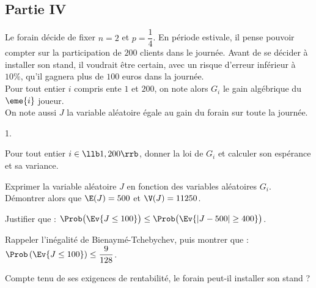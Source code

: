 \documentclass[11pt]{article}%
\begin{document}


\subsection*{Partie IV}

\noindent
Le forain décide de fixer $n = 2$ et $p = \dfrac{1}{4}$. En période
estivale, il pense pouvoir compter sur la participation de $200$
clients dans le journée. Avant de se décider à installer son stand, il
voudrait être certain, avec un risque d'erreur inférieur à $10 \%$,
qu'il gagnera plus de $100$ euros dans la journée.\\
Pour tout entier $i$ compris ente $1$ et $200$, on note alors $G_{i}$
le gain algébrique du $\eme{i}$ joueur.\\
On note aussi $J$ la variable aléatoire égale au gain du forain sur
toute la journée.
\begin{noliste}{1.}
  \setlength{\itemsep}{4mm}
\item Pour tout entier $i \in \llb 1,200 \rrb$, donner la loi de
  $G_{i}$ et calculer son espérance et sa variance.
  
  

\item Exprimer la variable aléatoire $J$ en fonction des variables
  aléatoires $G_{i}$.\\
  Démontrer alors que $\E(J) = 500$ et $\V(J) = 11250$.

  

\item Justifier que : $\Prob\big(\Ev{ J \leq 100}\big) \leq \Prob\big(
  \Ev{|J-500|\geq 400} \big)$.

  

\item Rappeler l'inégalité de Bienaymé-Tchebychev, puis montrer que :
  $\Prob\left(\Ev{J \leq 100}\right) \leq \dfrac{9}{128}$.

  

\item Compte tenu de ses exigences de rentabilité, le forain peut-il
  installer son stand ?

  
\end{noliste}
\end{document}
